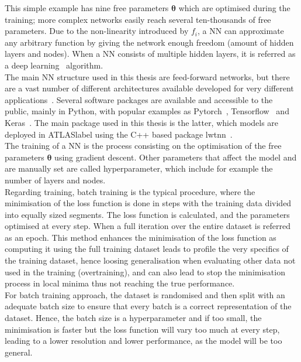 This simple example has nine free parameters $\boldsymbol{\theta}$ which are optimised during the training; more complex networks easily reach several ten-thousands of free parameters. Due to the non-linearity introduced by $f_i$, a NN can approximate any arbitrary function by giving the network enough freedom (amount of hidden layers and nodes). When a NN consists of multiple hidden layers, it is referred as a deep learning~\cite{Goodfellow-et-al-2016} algorithm.\\

The main NN structure used in this thesis are feed-forward networks, but there are a vast number of different architectures available developed for very different applications~\cite{livingreview}. Several software packages are available and accessible to the public,  mainly in Python, with popular examples as Pytorch~\cite{NEURIPS2019_9015}, Tensorflow~\cite{tensorflow2015-whitepaper} and Keras~\cite{chollet2015keras}. The main package used in this thesis is the latter, which models are deployed in \acrshort{ATLASlabel} using the C++ based package lwtnn~\cite{lwtnn}.\\

The training of a NN is the process consisting on the optimisation of the free parameters $\boldsymbol{\theta}$ using gradient descent. Other parameters that affect the model and are manually set are called hyperparameter, which include for example the number of layers and nodes.\\

Regarding training, batch training is the typical procedure, where the minimisation of the loss function is done in steps with the training data divided into equally sized segments. The loss function is calculated, and the parameters optimised at every step. When a full iteration over the entire dataset is referred as an epoch. This method enhances the minimisation of the loss function as computing it using the full training dataset leads to profile the very specifics of the training dataset, hence loosing generalisation when evaluating other data not used in the training (overtraining), and can also lead to stop the minimisation process in local minima thus not reaching the true performance.\\

For batch training approach, the dataset is randomised and then split with an adequate batch size to ensure that every batch is a correct representation of the dataset. Hence, the batch size is a hyperparameter and if too small, the minimisation is faster but the loss function will vary too much at every step, leading to a lower resolution and lower performance, as the model will be too general. 

